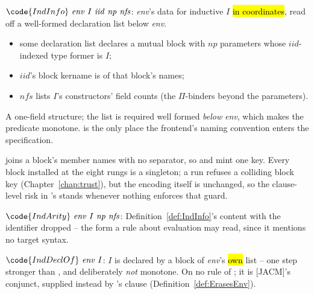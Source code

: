 \begin{definition}
\label{def:IndInfo}
\leanok
{}
 $\code{IndInfo}\ \mathit{env}\ I\ \mathit{iid}\ \mathit{np}\ \mathit{nfs}$: \emph{env}'s data for inductive $I$ \hl{in \lbox{} coordinates}, read off a well-formed declaration list below \emph{env}.
\begin{itemize}
\item some declaration list declares a mutual block with $\mathit{np}$ parameters whose $\mathit{iid}$-indexed type former is $I$;
\item $\mathit{iid}$'s block kername is  of that block's names;
\item $\mathit{nfs}$ lists $I$'s constructors' field counts (the $\Pi$-binders beyond the parameters).
\end{itemize}
 A one-field structure; the list is required well formed \emph{below} \emph{env}, which makes the predicate monotone.  is the only place the frontend's naming convention enters the specification.
\end{definition}

\begin{remark}
  joins a block's member names with no separator, so \code{[A, BC]} and \code{[AB, C]} mint one key. Every block installed at the eight rungs is a singleton; a run refuses a colliding block key (Chapter~\ref{chap:trust}), but the encoding itself is unchanged, so the clause-level risk in \ErasesEnv{}'s  stands whenever nothing enforces that guard.
\end{remark}

\begin{definition}
\label{def:IndArity}
\leanok
{}
 $\code{IndArity}\ \mathit{env}\ I\ \mathit{np}\ \mathit{nfs}$: Definition~\ref{def:IndInfo}'s content with the \lbox{} identifier dropped -- the form a rule about  evaluation may read, since it mentions no target syntax.
\end{definition}

\begin{definition}
\label{def:IndDeclOf}
\leanok
{}
 $\code{IndDeclOf}\ \mathit{env}\ I$: $I$ is declared by a block of \emph{env}'s \hl{own} list -- one step stronger than , and deliberately \emph{not} monotone.
 On no rule of \Erases{}; it is [JACM]'s   conjunct, supplied instead by \ErasesEnv{}'s  clause (Definition~\ref{def:ErasesEnv}).
\end{definition}

